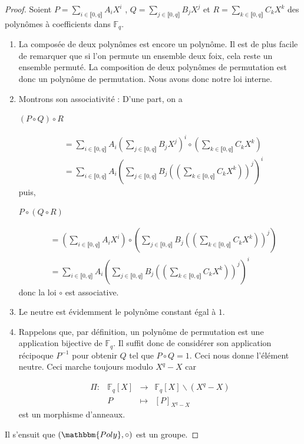 \documentclass[12pt]{article}
\newcommand{\Fq}{\mathds{F}_q}
\newcommand{\fonction}[5]{
\begin{displaymath}
\begin{array}{l|rcl}
\displaystyle
#1 : & #2 & \longrightarrow & #3 \\
    & #4 & \longmapsto & #5
\end{array}
\end{displaymath}
}
\theoremstyle{definition}
\begin{document}
\begin{proof}
Soient $ P = \displaystyle\sum_{i \in \llbracket 0, q \rrbracket} A_i X^i$ , $Q = \displaystyle\sum_{j \in \llbracket 0, q \rrbracket} B_j X^j$ et $R = \displaystyle\sum_{k \in \llbracket 0, q \rrbracket} C_k X^k$ des polynômes à coefficients dans $\Fq$. \newline
\break
	\begin{enumerate}[label=$\clubsuit$, font=\small  \color{black}]
		\item La composée de deux polynômes est encore un polynôme. Il est de plus facile de remarquer que si l'on permute un ensemble deux foix, cela reste un ensemble permuté. La composition de deux polynômes de permutation est donc un polynôme de permutation. Nous avons donc notre loi interne.
		\item Montrons son associativité : \newline
D'une part, on a
			\begin{center} $\left( P\circ Q \right) \circ R$ \end{center}
			\begin{align*} 
&= \displaystyle\sum_{i \in \llbracket 0, q \rrbracket} A_i\left(\displaystyle\sum_{j \in \llbracket 0, q \rrbracket} B_j X^j\right)^i \circ \left(\displaystyle\sum_{k \in \llbracket 0, q \rrbracket} C_k X^k\right) \\ 
&= \displaystyle\sum_{i \in \llbracket 0, q \rrbracket} A_i\left(\displaystyle\sum_{j \in \llbracket 0, q \rrbracket} B_j \left(\left(\displaystyle\sum_{k \in \llbracket 0, q \rrbracket} C_k X^k\right)\right)^j\right)^i
			\end{align*} 
puis, 
			\begin{center} $P\circ \left(Q \circ R\right)$ \end{center}
			\begin{align*} 
&= \left(\displaystyle\sum_{i \in \llbracket 0, q \rrbracket} A_i X^i\right) \circ \left(\displaystyle\sum_{j \in \llbracket 0, q \rrbracket} B_j \left(\left(\displaystyle\sum_{k \in \llbracket 0, q \rrbracket} C_k X^k\right)\right)^j\right) \\
&=  \displaystyle\sum_{i \in \llbracket 0, q \rrbracket} A_i\left(\displaystyle\sum_{j \in \llbracket 0, q \rrbracket} B_j \left(\left(\displaystyle\sum_{k \in \llbracket 0, q \rrbracket} C_k X^k\right)\right)^j\right)^i
			\end{align*} 
donc la loi $\circ$ est associative.
	\item Le neutre est évidemment le polynôme constant égal à $1$.
	\item Rappelons que, par définition, un polynôme de permutation est une application bijective de $\Fq$. Il suffit donc de considérer son application récipoque $P^{-1}$ pour obtenir $Q$ tel que $P\circ Q = 1$. Ceci nous donne l'élément neutre. Ceci marche toujours modulo $X^q - X$ car
	\fonction{\Pi}{\Fq[X]}{\Fq[X] \backslash (X^q - X)}{P}{[P]_{X^q - X}} est un morphisme d'anneaux.
	\end{enumerate}	
Il s'ensuit que $(\mathbbm{Poly}, \circ)$ est un groupe. 
\end{proof}
\end{document}
